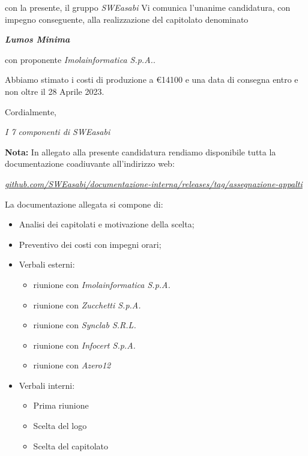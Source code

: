 \documentclass{article}
\begin{document}
con la presente, il gruppo \textit{SWEasabi} Vi comunica l'unanime candidatura, con impegno conseguente, alla realizzazione del capitolato denominato

\begin{center}
    \textbf{\textit{Lumos Minima}}
\end{center}

con proponente \textit{Imolainformatica S.p.A.}.

Abbiamo stimato i costi di produzione a €14100 e una data di consegna entro e non oltre il 28 Aprile 2023.

Cordialmente,

\begin{flushright}
\textit{I 7 componenti di SWEasabi}
\end{flushright}

\textbf{Nota:} In allegato alla presente candidatura rendiamo disponibile tutta la documentazione coadiuvante all'indirizzo web:

\begin{center}
    \href{https://github.com/SWEasabi/documentazione-interna/releases/tag/assegnazione-appalti}{\textit{github.com/SWEasabi/documentazione-interna/releases/tag/assegnazione-appalti}}
\end{center}

La documentazione allegata si compone di:
\begin{itemize}
    \item Analisi dei capitolati e motivazione della scelta;
    \item Preventivo dei costi con impegni orari;
    \item Verbali esterni:
    \begin{itemize}
        \item riunione con \textit{Imolainformatica S.p.A.}
        \item riunione con \textit{Zucchetti S.p.A.}
        \item riunione con \textit{Synclab S.R.L.}
        \item riunione con \textit{Infocert S.p.A.}
        \item riunione con \textit{Azero12}
    \end{itemize}
    \item Verbali interni:
    \begin{itemize}
        \item Prima riunione
        \item Scelta del logo
        \item Scelta del capitolato
    \end{itemize}
\end{itemize}
\end{document}

